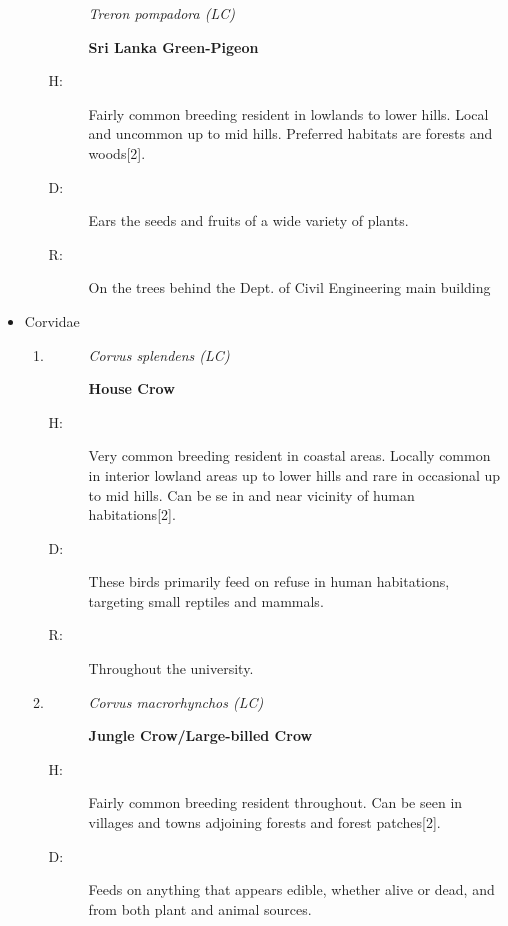 \begin{itemize}
\begin{enumerate}
\begin{description}%
\item[]%
\textit{Treron pompadora (LC)}%
\item[]%
\textbf{Sri Lanka Green{-}Pigeon}%
\end{description}%
\begin{description}%
\item[H: ]%
Fairly common breeding resident in lowlands to lower hills. Local and uncommon up to mid hills. Preferred habitats are forests and woods{[}2{]}.%
\item[D: ]%
 Ears the seeds and fruits of a wide variety of plants.%
\item[R: ]%
On the trees behind the Dept. of Civil Engineering main building%
\end{description}%
\end{enumerate}%
\item%
Corvidae%
\begin{enumerate}%
\item%
\begin{description}%
\item[]%
\textit{Corvus splendens (LC)}%
\item[]%
\textbf{House Crow}%
\end{description}%
\begin{description}%
\item[H: ]%
Very common breeding resident in coastal areas. Locally common in interior lowland areas up to lower hills and rare in occasional up to mid hills. Can be se in and near vicinity of human habitations{[}2{]}.%
\item[D: ]%
These birds primarily feed on refuse in human habitations, targeting small reptiles and mammals. %
\item[R: ]%
Throughout the university. %
\end{description}%
\item%
\begin{description}%
\item[]%
\textit{Corvus macrorhynchos (LC)}%
\item[]%
\textbf{Jungle Crow/Large{-}billed Crow}%
\end{description}%
\begin{description}%
\item[H: ]%
Fairly common breeding resident throughout. Can be seen in villages and towns adjoining forests and forest patches{[}2{]}.%
\item[D: ]%
Feeds on anything that appears edible, whether alive or dead, and from both plant and animal sources.%

\end{description}
\end{enumerate}
\end{itemize}
